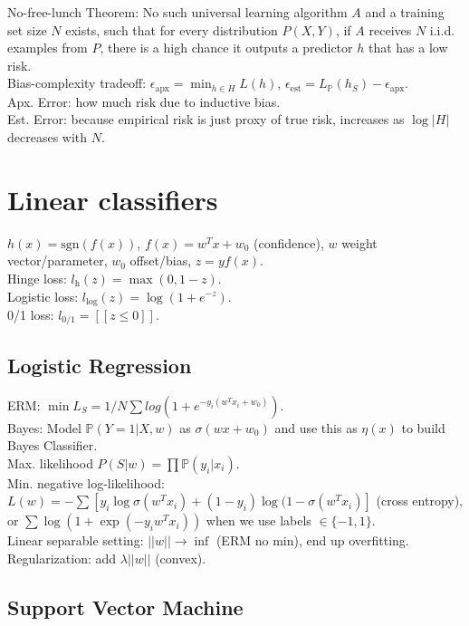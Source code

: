 No-free-lunch Theorem: No such universal learning algorithm $A$ and a training set size $N$ exists, such that for every distribution $P(X,Y)$, if $A$ receives $N$ i.i.d. examples from $P$, there is a high chance it outputs a predictor $h$ that has a low risk.\\
Bias-complexity tradeoff: $\epsilon_{\text{apx}} = \min_{h \in H}L(h)$, $\epsilon_{\text{est}} = L_\mathbb{P}(h_S) - \epsilon_{\text{apx}}$.\\
Apx. Error: how much risk due to inductive bias.\\
Est. Error: because empirical risk is just proxy of true risk, increases as $\log |H|$ decreases with $N$.

\section{Linear classifiers}

$h(x) = \text{sgn}(f(x))$, $f(x) = w^T x + w_0$ (confidence), $w$ weight vector/parameter, $w_0$ offset/bias, $z = yf(x)$.\\
Hinge loss: $l_{\text{h}}(z) = \max(0, 1-z)$.\\
Logistic loss: $l_{\log}(z) = \log(1+e^{-z})$.\\
0/1 loss: $l_{\text{0/1}} = [[z \leq 0]]$.

\subsection*{Logistic Regression}

ERM: $\min L_S = 1/N \sum log(1+e^{-y_i(w^T x_i + w_0)})$.\\
Bayes: Model $\mathbb{P}(Y=1|X, w)$ as $\sigma(w x +w_0)$ and use this as $\eta(x)$ to build Bayes Classifier.\\
Max. likelihood $P(S|w) = \prod \mathbb{P}(y_i|x_i)$.\\
Min. negative log-likelihood: $L(w) = -\sum[y_i \log \sigma(w^T x_i) + (1 - y_i) \log(1 - \sigma(w^T x_i)]$ (cross entropy), or $\sum \log(1 + \exp(-y_i w^T x_i))$ when we use labels $\in \{-1, 1\}$.\\
Linear separable setting: $||w|| \rightarrow \inf$ (ERM no min), end up overfitting.\\
Regularization: add $\lambda ||w||$ (convex).

\subsection*{Support Vector Machine}

